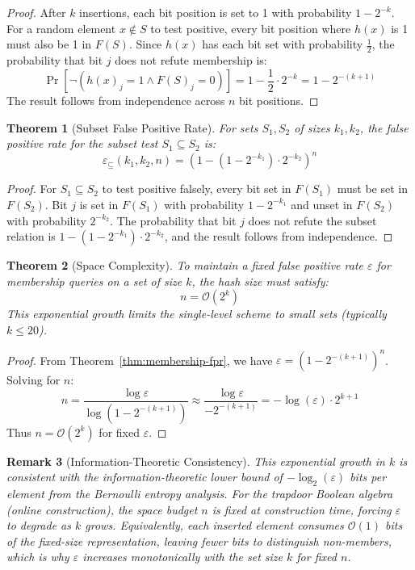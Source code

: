 \documentclass[10pt,conference]{IEEEtran}
\newtheorem{theorem}{Theorem}
\newtheorem{remark}[theorem]{Remark}
\begin{document}
\begin{proof}
After $k$ insertions, each bit position is set to 1 with probability $1 - 2^{-k}$. For a random element $x \notin S$ to test positive, every bit position where $h(x)$ is 1 must also be 1 in $F(S)$. Since $h(x)$ has each bit set with probability $\frac{1}{2}$, the probability that bit $j$ does not refute membership is:
$$\Pr[\neg(h(x)_j = 1 \land F(S)_j = 0)] = 1 - \frac{1}{2} \cdot 2^{-k} = 1 - 2^{-(k+1)}$$
The result follows from independence across $n$ bit positions.
\end{proof}

\begin{theorem}[Subset False Positive Rate]
\label{thm:subset-fpr}
For sets $S_1, S_2$ of sizes $k_1, k_2$, the false positive rate for the subset test $S_1 \subseteq S_2$ is:
$$\varepsilon_{\subseteq}(k_1, k_2, n) = \left(1 - (1 - 2^{-k_1}) \cdot 2^{-k_2}\right)^n$$
\end{theorem}

\begin{proof}
For $S_1 \subseteq S_2$ to test positive falsely, every bit set in $F(S_1)$ must be set in $F(S_2)$. Bit $j$ is set in $F(S_1)$ with probability $1 - 2^{-k_1}$ and unset in $F(S_2)$ with probability $2^{-k_2}$. The probability that bit $j$ does not refute the subset relation is $1 - (1-2^{-k_1}) \cdot 2^{-k_2}$, and the result follows from independence.
\end{proof}

\begin{theorem}[Space Complexity]
\label{thm:space-complexity}
To maintain a fixed false positive rate $\varepsilon$ for membership queries on a set of size $k$, the hash size must satisfy:
$$n = \mathcal{O}(2^k)$$
This exponential growth limits the single-level scheme to small sets (typically $k \leq 20$).
\end{theorem}

\begin{proof}
From Theorem~\ref{thm:membership-fpr}, we have $\varepsilon = (1 - 2^{-(k+1)})^n$. Solving for $n$:
$$n = \frac{\log \varepsilon}{\log(1 - 2^{-(k+1)})} \approx \frac{\log \varepsilon}{-2^{-(k+1)}} = -\log(\varepsilon) \cdot 2^{k+1}$$
Thus $n = \mathcal{O}(2^k)$ for fixed $\varepsilon$.
\end{proof}

\begin{remark}[Information-Theoretic Consistency]
\label{rem:info-theoretic-bound}
This exponential growth in $k$ is consistent with the information-theoretic lower bound of $-\log_2(\varepsilon)$ bits per element from the Bernoulli entropy analysis. For the trapdoor Boolean algebra (online construction), the space budget $n$ is fixed at construction time, forcing $\varepsilon$ to degrade as $k$ grows. Equivalently, each inserted element consumes $\mathcal{O}(1)$ bits of the fixed-size representation, leaving fewer bits to distinguish non-members, which is why $\varepsilon$ increases monotonically with the set size $k$ for fixed $n$.
\end{remark}
\end{document}

